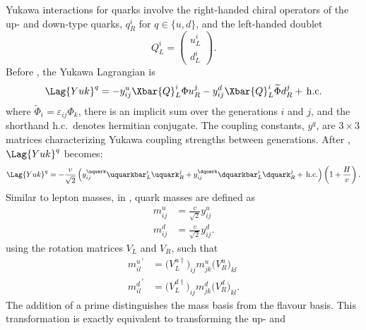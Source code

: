 Yukawa interactions for quarks involve the right-handed chiral operators of the up- and down-type
quarks, $q_R^i$ for $q\in\{u,d\}$, and the left-handed doublet
\begin{equation}
  Q_L^i = \begin{pmatrix}u^i_L\\d^i_L\end{pmatrix}.
\end{equation}
Before \SSB, the Yukawa Lagrangian is
\begin{equation}
  \Lag{Yuk}^q = - y_{ij}^u\Xbar{Q}_L^i\Phi u_R^j
  - y_{ij}^d\Xbar{Q}_L^i\widetilde\Phi d_R^j +\,\mathrm{h.c.}
  \label{eq:th:lagyukq}
\end{equation}
where $\widetilde\Phi_i = \varepsilon_{ij}\Phi_k$, there is an implicit sum over the generations
$i$ and $j$, and the shorthand h.c.~denotes hermitian conjugate.
The coupling constants, $y^{q}$, are $3\times3$ matrices characterizing Yukawa coupling strengths
between generations.
After \SSB, $\Lag{Yuk}^q$ becomes:
\begin{equation}
  \Lag{Yuk}^q =
  - \frac{v}{\sqrt{2}}
  \left(
  y_{ij}^\uquark\uquarkbar_L^i\uquark_R^j
  + y_{ij}^\dquark\dquarkbar_L^i\dquark_R^j
  +\,\mathrm{h.c.}
  \right)
  \left(1 + \frac{H}{v}\right).
  \label{eq:th:lagyuk2}
\end{equation}
Similar to lepton masses, in , quark masses are defined as
\begin{align}
  m_{ij}^u &= \frac{v}{\sqrt{2}}y_{ij}^u \nonumber\\
  m_{ij}^d &= \frac{v}{\sqrt{2}}y_{ij}^d.
\end{align}
 using the rotation matrices $V_L$ and $V_R$, such that
\begin{align}
  {m_{il}^{u}}^\prime &=  \big(V_L^{u\dagger}\big)_{ij} m_{jk}^u\big(V_R^u\big)_{kl} \nonumber\\
  {m_{il}^{d}}^\prime &=  \big(V_L^{d\dagger}\big)_{ij} m_{jk}^d\big(V_R^d\big)_{kl}.
\end{align}
The addition of a prime distinguishes the mass basis from the flavour basis.
This transformation is exactly equivalent to transforming the up- and
